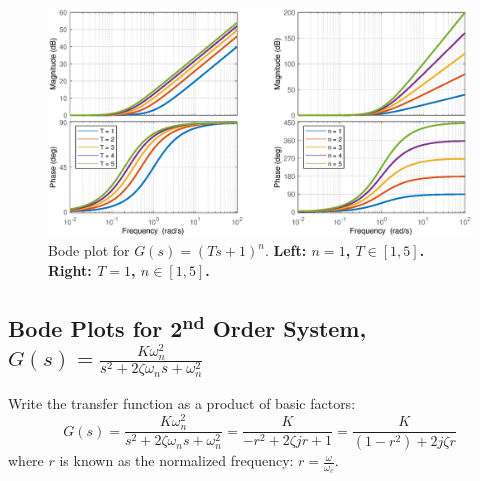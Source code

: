 \begin{figure}
    \centering
    \includegraphics[width=\textwidth]{images/bode2.eps}
    \caption{Bode plot for $G(s) = (Ts+1)^{n}$. \textbf{Left: $n=1$, $T\in [1,5]$. Right: $T=1$, $n\in [1,5]$.}}
\end{figure}

\subsection{Bode Plots for 2\textsuperscript{nd} Order System, $G(s) = \frac{K\omega_{n}^{2}}{s^{2}+2\zeta\omega_{n}s+\omega_{n}^{2}}$}
Write the transfer function as a product of basic factors:
\[
    G(s) = \frac{K\omega_{n}^{2}}{s^{2}+2\zeta\omega_{n}s+\omega_{n}^{2}}=\frac{K}{-r^{2}+2\zeta jr +1}=\frac{K}{(1-r^{2})+2j\zeta r}
\]
where $r$ is known as the normalized frequency: $r = \frac{\omega}{\omega_{c}}$.

